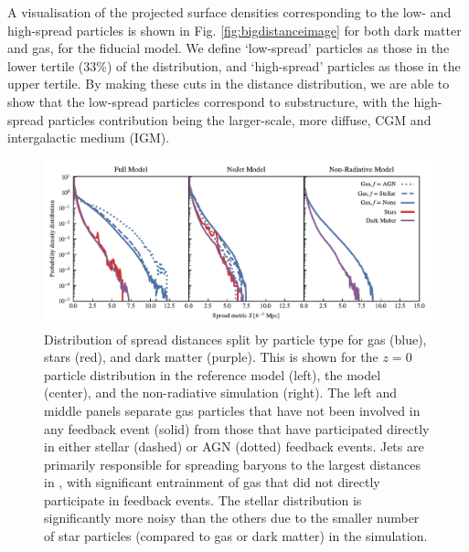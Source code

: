 A visualisation of the projected surface densities corresponding to the low-
and high-spread particles is shown in Fig. \ref{fig:bigdistanceimage} for
both dark matter and gas, for the fiducial \simba{} model. We define
`low-spread' particles as those in the lower tertile (33\%) of the
distribution, and `high-spread' particles as those in the upper tertile. By
making these cuts in the distance distribution, we are able to show that the
low-spread particles correspond to substructure, with the high-spread
particles contribution being the larger-scale, more diffuse, CGM and
intergalactic medium (IGM).


\begin{figure}
    \centering
    \includegraphics[width=\textwidth]{figures/neighbour_analysis_feedback_histogram_combined.pdf}
    \vspace{-0.7cm}
    \caption{Distribution of spread distances split by particle type for gas
    (blue), stars (red), and dark matter (purple). This is shown for the
    $z=0$ particle distribution in the reference model (left), the \nojet{}
    model (center), and the non-radiative simulation (right). The left and
    middle panels separate gas particles that have not been involved in any
    feedback event (solid) from those that have participated directly in
    either stellar (dashed) or AGN (dotted) feedback events. Jets are
    primarily responsible for spreading baryons to the largest distances in
    \simba{}, with significant entrainment of gas that did not directly
    participate in feedback events. The stellar distribution is significantly
    more noisy than the others due to the smaller number of star particles
    (compared to gas or dark matter) in the simulation.
    }\label{fig:feedbackdistance}
\end{figure}



